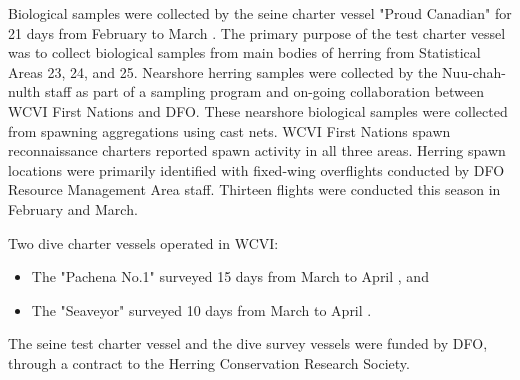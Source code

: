 Biological samples were collected by the seine charter vessel "Proud Canadian"
for 21 days from February  to March .
The primary purpose of the test charter vessel was to collect biological samples from
main bodies of herring from Statistical Areas 23, 24, and 25.
Nearshore herring samples were collected by the Nuu-chah-nulth staff
as part of a sampling program and on-going collaboration between WCVI First Nations and DFO.
These nearshore biological samples were collected from spawning aggregations using cast nets.
WCVI First Nations spawn reconnaissance charters reported spawn activity in all three areas.
Herring spawn locations were primarily identified with fixed-wing overflights conducted by
DFO Resource Management Area staff.
Thirteen flights were conducted this season in February and March.

Two dive charter vessels operated in WCVI:
\begin{itemize}
\item The "Pachena No.1" surveyed 15 days from March  to April , and
\item The "Seaveyor" surveyed 10 days from March  to April .
\end{itemize}
The seine test charter vessel and the dive survey vessels were funded by DFO,
through a contract to the Herring Conservation Research Society.
